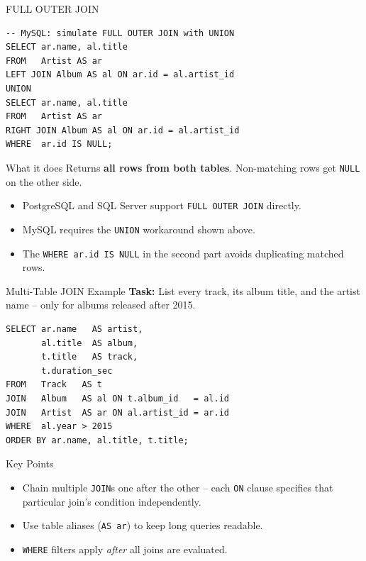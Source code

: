 \begin{frame}[fragile]{FULL OUTER JOIN}
  \begin{center}\end{center}

  \begin{lstlisting}[style=sqlstyle]
-- MySQL: simulate FULL OUTER JOIN with UNION
SELECT ar.name, al.title
FROM   Artist AS ar
LEFT JOIN Album AS al ON ar.id = al.artist_id
UNION
SELECT ar.name, al.title
FROM   Artist AS ar
RIGHT JOIN Album AS al ON ar.id = al.artist_id
WHERE  ar.id IS NULL;
  \end{lstlisting}

  \begin{block}{What it does}
    Returns \textbf{all rows from both tables}. Non-matching rows get \texttt{NULL} on the other side.
  \end{block}

  \begin{itemize}
    \item PostgreSQL and SQL Server support \texttt{FULL OUTER JOIN} directly.
    \item MySQL requires the \texttt{UNION} workaround shown above.
    \item The \texttt{WHERE ar.id IS NULL} in the second part avoids duplicating matched rows.
  \end{itemize}
\end{frame}

\begin{frame}[fragile]{Multi-Table JOIN Example}
  \textbf{Task:} List every track, its album title, and the artist name -- only for albums
  released after 2015.

  \begin{lstlisting}[style=sqlstyle]
SELECT ar.name   AS artist,
       al.title  AS album,
       t.title   AS track,
       t.duration_sec
FROM   Track   AS t
JOIN   Album   AS al ON t.album_id   = al.id
JOIN   Artist  AS ar ON al.artist_id = ar.id
WHERE  al.year > 2015
ORDER BY ar.name, al.title, t.title;
  \end{lstlisting}

  \begin{block}{Key Points}
    \begin{itemize}
      \item Chain multiple \texttt{JOIN}s one after the other -- each \texttt{ON} clause specifies
            that particular join's condition independently.
      \item Use table aliases (\texttt{AS ar}) to keep long queries readable.
      \item \texttt{WHERE} filters apply \emph{after} all joins are evaluated.
    \end{itemize}
  \end{block}
\end{frame}

